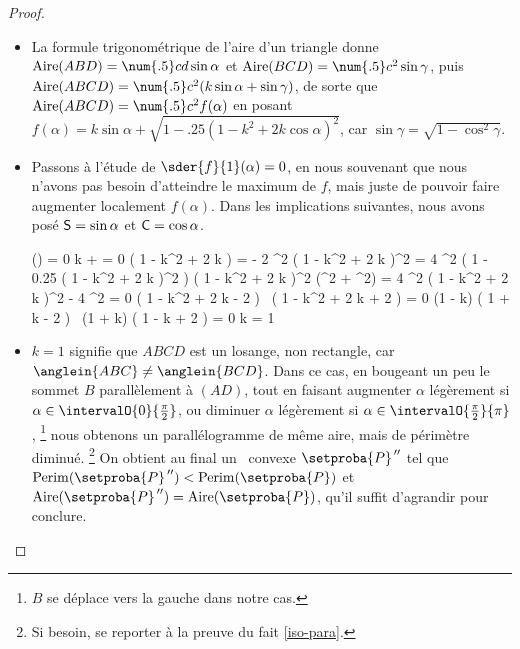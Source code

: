 \begin{proof}
\begin{itemize}
	    \item La formule trigonométrique de l'aire d'un triangle donne
	    $\area{ABD} = \num{.5} c d \sin \alpha$
	    et
	    $\area{BCD} = \num{.5} c^2 \sin \gamma$,
	   	puis
	    $\area{ABCD} = \num{.5} c^2 ( k \sin \alpha + \sin \gamma )$,
	    de sorte que
    	$\area{ABCD} = \num{.5} c^2 f(\alpha)$
    	en posant 
    	$f(\alpha) = k \sin \alpha + \sqrt{1 - \num{.25} ( 1 - k^2 + 2 k \cos \alpha)^2}$,
	    car 
	    $\sin \gamma = \sqrt{1 - \cos^2 \gamma}$.


	    \item Passons à l'étude de $\sder{f}{1}(\alpha) = 0$, en nous souvenant que nous n'avons pas besoin d'atteindre le maximum de $f$, mais juste de pouvoir faire augmenter localement $f(\alpha)$. 
	    Dans les implications suivantes, nous avons posé 
	    $\mathsf{S} = \sin \alpha$ et $\mathsf{C} = \cos \alpha$.
	    
	    \begin{stepcalc}[style=ar*, ope={\implies[d'où]}]
	        (\alpha) = 0
	    \explnext{}
	        k 
	        +
	        =
	        0
	    \explnext{}
	         ( 1 - k^2 + 2 k ) 
	        =
	        - 2  
	    \explnext{}
	        ^2 ( 1 - k^2 + 2 k )^2
	        =
	        4 ^2 \big( 1 - \num{.25} ( 1 - k^2 + 2 k )^2 \big)
	    \explnext{}
	        ( 1 - k^2 + 2 k )^2 (^2 + ^2)
	        =
	        4 ^2
	        ( 1 - k^2 + 2 k )^2 - 4 ^2 = 0
	    \explnext{}
	        ( 1 - k^2 + 2 k  - 2  )
	        \,
	        ( 1 - k^2 + 2 k  + 2  )
	        = 0
	    \explnext{}
	        (1 - k) ( 1 + k - 2  )
	        \,
	        (1 + k) ( 1 - k + 2  ) = 0
	        k = 1
	        \,\,  \,\,
	         \in {}
	    \end{stepcalc}


	    \item $k = 1$ signifie que $ABCD$ est un losange, non rectangle, car $\anglein{ABC} \neq \anglein{BCD}$.
	    Dans ce cas, en bougeant un peu le sommet $B$ parallèlement à $(AD)$, tout en faisant
	    augmenter $\alpha$ légèrement si $\alpha \in \intervalO{0}{\frac{\pi}{2}}$,
	    ou
	    diminuer $\alpha$ légèrement si $\alpha \in \intervalO{\frac{\pi}{2}}{\pi}$,%
	    \footnote{
	        $B$ se déplace vers la gauche dans notre cas.
	    }
	    nous obtenons un parallélogramme de même aire, mais de périmètre diminué.%
	    \footnote{
	        Si besoin, se reporter à la preuve du fait \ref{iso-para}.
	    }
	    On obtient au final un \ngone\ convexe $\dbleprimeit{\setproba{P}}$ tel que
		$\perim{\dbleprimeit{\setproba{P}}} < \perim{\setproba{P}}$
		et
		$\area{\dbleprimeit{\setproba{P}}} = \area{\setproba{P}}$,
		qu'il suffit d'agrandir pour conclure.



\end{itemize}
\end{proof}
